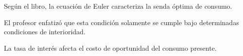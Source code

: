 \documentclass[12pt]{article}
\begin{document}
\begin{tadelis}
Según el libro, la ecuación de Euler caracteriza
la senda óptima de consumo.
\end{tadelis}
\begin{comentarioprofe}
El profesor enfatizó que esta condición solamente se cumple
bajo determinadas condiciones de interioridad.
\end{comentarioprofe}
\begin{importante}
La tasa de interés afecta el costo de oportunidad
del consumo presente.
\end{importante}
\end{document}
